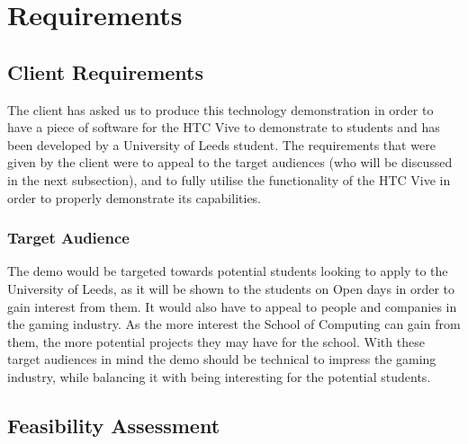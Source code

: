 \chapter{Requirements}
\label{chapter3}

\section{Client Requirements}
	The client has asked us to produce this technology demonstration in order to have a piece of software for the HTC Vive to demonstrate to students and has been developed by a University of Leeds student. The requirements that were given by the client were to appeal to the target audiences (who will be discussed in the next subsection), and to fully utilise the functionality of the HTC Vive in order to properly demonstrate its capabilities.

\subsection{Target Audience}
The demo would be targeted towards potential students looking to apply to the University of Leeds, as it will be shown to the students on Open days in order to gain interest from them.
It would also have to appeal to people and companies in the gaming industry. As the more interest the School of Computing can gain from them, the more potential projects they may have for the school.
With these target audiences in mind the demo should be technical to impress the gaming industry, while balancing it with being interesting for the potential students.

\section{Feasibility Assessment}

